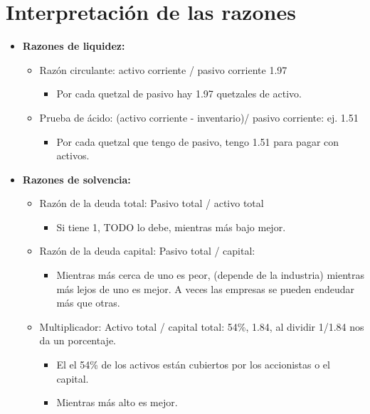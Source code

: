 \documentclass{article}
\begin{document}
\section{Interpretación de las razones}
\begin{itemize}
    \item \large\textbf{Razones de liquidez:}\normalsize
    \begin{itemize}
        \item Razón circulante: activo corriente / pasivo corriente 1.97
            \begin{itemize}
                \item Por cada quetzal de pasivo hay 1.97 quetzales de activo.  
            \end{itemize}
        \item Prueba de ácido: (activo corriente - inventario)/ pasivo corriente:  ej. 1.51
            \begin{itemize}
                \item Por cada quetzal que tengo de pasivo, tengo 1.51 para pagar con activos.
            \end{itemize}
    \end{itemize}

    \item \large\textbf{Razones de solvencia:}\normalsize
        \begin{itemize}
            \item Razón de la deuda total: Pasivo total / activo total
                \begin{itemize}
                    \item Si tiene 1, TODO lo debe, mientras más bajo mejor. 
                \end{itemize}

            \item Razón de la deuda capital: Pasivo total / capital: 
                \begin{itemize}
                    \item Mientras más cerca de uno es peor, (depende de la industria) mientras más lejos de uno es mejor. A veces las empresas se pueden endeudar más que otras. 
                \end{itemize}
            \item Multiplicador: Activo total / capital total: 54\%, 1.84, al dividir 1/1.84 nos da un porcentaje.
                \begin{itemize}
                    \item El el 54\% de los activos están cubiertos por los accionistas o el capital.
                    \item Mientras más alto es mejor. 
                \end{itemize}
        \end{itemize}


\end{itemize}
\end{document}

